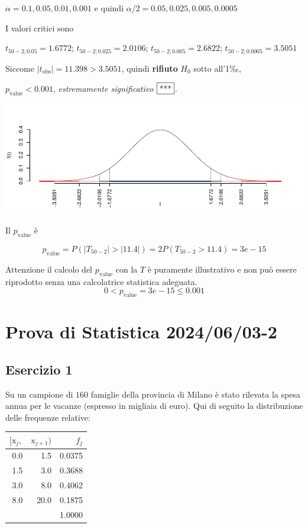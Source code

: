 \documentclass[
  11pt,
]{book}
\theoremstyle{mytheoremstyle}
\theoremstyle{mydefstyle}
\newenvironment{sol}
  {
  \begin{tcolorbox}[enhanced,breakable,arc=0.1mm,boxrule=1pt,colback=white,colframe=iblue,
  title=\bf \fontfamily{lmss}\selectfont \hspace{.5 cm} Soluzione,drop fuzzy shadow]

}{
\end{tcolorbox}
  }
\begin{document}
\begin{sol}
\(\alpha=0.1, 0.05, 0.01, 0.001\) e quindi \(\alpha/2=0.05, 0.025, 0.005, 0.0005\)

I valori critici sono

\(t_{50-2;0.05}=1.6772\); \(t_{50-2;0.025}=2.0106\); \(t_{50-2;0.005}=2.6822\); \(t_{50-2;0.0005}=3.5051\)

Siccome \(|t_\text{obs}|=11.398>3.5051\), quindi \textbf{rifiuto} \(H_0\) sotto all'1‰,

\(p_\text{value}<0.001\), \emph{estremamente significativo} \(\fbox{***}\).

\begin{center}\includegraphics{Esami_passati_con_soluzioni_files/figure-latex/2024-49-1} \end{center}

Il \(p_{\text{value}}\) è

\[ p_{\text{value}} = P(|T_{50-2}|>|11.4|)=2P(T_{50-2}>11.4)=3e-15 \]

Attenzione il calcolo del \(p_\text{value}\) con la \(T\) è puramente illustrativo e non può essere riprodotto senza una calcolatrice statistica adeguata.\[
 0 < p_\text{value}= 3e-15 \leq 0.001 
\]

\end{sol}

\section{Prova di Statistica 2024/06/03-2}\label{prova-di-statistica-20240603-2}

\subsection{Esercizio 1}\label{esercizio-1-36}

Su un campione di \(160\) famiglie della provincia di Milano è stato rilevata la spesa annua per le vacanze (espresso in migliaia di euro). Qui di seguito la distribuzione delle frequenze relative:

\begin{table}[H]
\centering
\begin{tabular}{rrr}
\toprule
$[\text{x}_j,$ & $\text{x}_{j+1})$ & $f_j$\\
\midrule
0.0 & 1.5 & 0.0375\\
1.5 & 3.0 & 0.3688\\
3.0 & 8.0 & 0.4062\\
8.0 & 20.0 & 0.1875\\
 &  & 1.0000\\
\bottomrule
\end{tabular}
\end{table}
\end{document}
